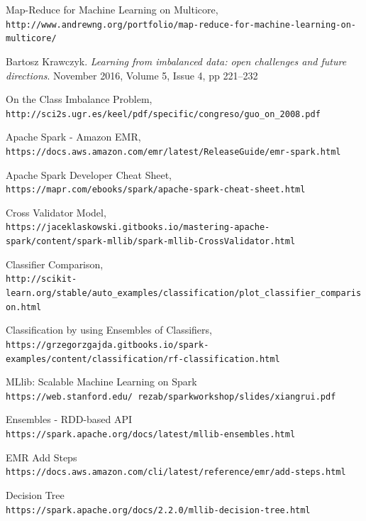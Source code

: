 \documentclass{neu_handout}
\begin{document}
\begin{thebibliography}{9}

Map-Reduce for Machine Learning on Multicore,
\\\texttt{http://www.andrewng.org/portfolio/map-reduce-for-machine-learning-on-multicore/}

 Bartosz Krawczyk. \textsl{Learning from imbalanced data: open challenges and future directions}. November 2016, Volume 5, Issue 4, pp 221–232

On the Class Imbalance Problem,
\\\texttt{http://sci2s.ugr.es/keel/pdf/specific/congreso/guo\_on\_2008.pdf}

Apache Spark - Amazon EMR,
\\\texttt{https://docs.aws.amazon.com/emr/latest/ReleaseGuide/emr-spark.html}

Apache Spark Developer Cheat Sheet,
\\\texttt{https://mapr.com/ebooks/spark/apache-spark-cheat-sheet.html}

Cross Validator Model,
\\\texttt{https://jaceklaskowski.gitbooks.io/mastering-apache-spark/content/spark-mllib/spark-mllib-CrossValidator.html}

Classifier Comparison,
\\\texttt{http://scikit-learn.org/stable/auto\_examples/classification/plot\_classifier\_comparison.html}

Classification by using Ensembles of Classifiers,
\\\texttt{https://grzegorzgajda.gitbooks.io/spark-examples/content/classification/rf-classification.html}


MLlib: Scalable Machine Learning on Spark
\\\texttt{https://web.stanford.edu/~rezab/sparkworkshop/slides/xiangrui.pdf}


Ensembles - RDD-based API
\\\texttt{https://spark.apache.org/docs/latest/mllib-ensembles.html}

EMR Add Steps
\\\texttt{https://docs.aws.amazon.com/cli/latest/reference/emr/add-steps.html}

Decision Tree
\\\texttt{https://spark.apache.org/docs/2.2.0/mllib-decision-tree.html}


\end{thebibliography}
\end{document}
